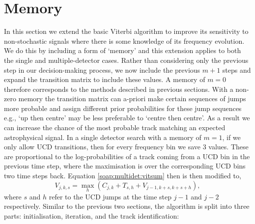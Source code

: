 \section{\label{soap:memory} Memory}
%
%
In this section we extend the basic Viterbi algorithm to improve its sensitivity to non-stochastic signals where there is some knowledge of its frequency evolution.
We do this by including a form of `memory' and this extension applies to both the single and multiple-detector cases.
Rather than considering only the previous step in our decision-making process, we now include the previous $m+1$ steps and expand the transition matrix to include these values.
A memory of $m=0$ therefore corresponds to the methods described in previous sections.
With a non-zero memory the transition matrix can a-priori make certain sequences of jumps more probable and assign different prior probabilities for these jump sequences e.g., `up then centre' may be less preferable to `centre then centre'.
As a result we can increase the chance of the most probable track matching an expected astrophysical signal.
In a single detector search with a memory of $m=1$, if we only allow \gls{UCD} transitions, then for every frequency bin we save 3 values. These are proportional to the log-probabilities of a track coming from a \gls{UCD} bin in the previous time step, where the maximisation is over the corresponding \gls{UCD} bins two time steps back.
Equation \ref{soap:multidet:vitsum} then is then modified to,
%
\begin{equation}
\label{soap:memory:stat}
V_{j,k,s} = \max_{h} ({C}_{j,k} + T_{s,h} +  V_{j-1,k+s,k+s+h}),
\end{equation}
%
where $s$ and $h$ refer to the \gls{UCD} jumps at the time step $j-1$ and $j-2$ respectively.  Similar to the previous two sections, the algorithm is split into three parts: initialisation, iteration, and the track identification:


